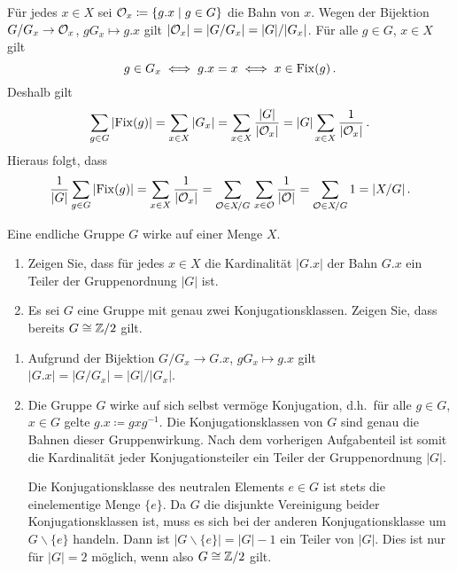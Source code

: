\begin{solution}
  Für jedes $x \in X$ sei $\mathcal{O}_x \coloneqq \{g.x \mid g \in G\}$ die Bahn von $x$.
  Wegen der Bijektion $G/G_x \to \mathcal{O}_x$, $g G_x \mapsto g.x$ gilt $|\mathcal{O}_x| = |G/G_x| = |G|/|G_x|$.
  Für alle $g \in G$, $x \in X$ gilt
  \[
          g \in G_x
    \iff  g.x = x
    \iff  x \in \operatorname{Fix}(g) \,.
  \]
  Deshalb gilt
  \[
      \sum_{g \in G} |{\operatorname{Fix}(g)}|
    = \sum_{x \in X} |G_x|
    = \sum_{x \in X} \frac{|G|}{|\mathcal{O}_x|}
    = |G| \sum_{x \in X} \frac{1}{|\mathcal{O}_x|} \,.
  \]
  Hieraus folgt, dass
  \[
      \frac{1}{|G|} \sum_{g \in G} |{\operatorname{Fix}(g)}|
    = \sum_{x \in X} \frac{1}{|\mathcal{O}_x|}
    = \sum_{\mathcal{O} \in X\!/G} \, \sum_{x \in \mathcal{O}} \frac{1}{|\mathcal{O}|}
    = \sum_{\mathcal{O} \in X\!/G} 1
    = |X/G| \,.
  \]

\end{solution}


\begin{question}[subtitle = Genau zwei Konjugationsklassen]
  Eine endliche Gruppe $G$ wirke auf einer Menge $X$.
  \begin{enumerate}
    \item
      Zeigen Sie, dass für jedes $x \in X$ die Kardinalität $|G.x|$ der Bahn $G.x$ ein Teiler der Gruppenordnung $|G|$ ist.
    \item
      Es sei $G$ eine Gruppe mit genau zwei Konjugationsklassen.
      Zeigen Sie, dass bereits $G \cong \mathbb{Z}/2$ gilt.
  \end{enumerate}
\end{question}


\begin{solution}
  \begin{enumerate}
    \item
      Aufgrund der Bijektion $G/G_x \to G.x$, $gG_x \mapsto g.x$ gilt $|G.x| = |G/G_x| = |G|/|G_x|$.
    \item
      Die Gruppe $G$ wirke auf sich selbst vermöge Konjugation, d.h.\ für alle $g \in G$, $x \in G$ gelte $g.x \coloneqq gxg^{-1}$.
      Die Konjugationsklassen von $G$ sind genau die Bahnen dieser Gruppenwirkung.
      Nach dem vorherigen Aufgabenteil ist somit die Kardinalität jeder Konjugationsteiler ein Teiler der Gruppenordnung $|G|$.
      
      Die Konjugationsklasse des neutralen Elements $e \in G$ ist stets die einelementige Menge $\{e\}$.
      Da $G$ die disjunkte Vereinigung beider Konjugationsklassen ist, muss es sich bei der anderen Konjugationsklasse um $G \smallsetminus \{e\}$ handeln.
      Dann ist $|G \smallsetminus \{e\}| = |G|-1$ ein Teiler von $|G|$.
      Dies ist nur für $|G| = 2$ möglich, wenn also $G \cong \mathbb{Z}/2$ gilt.
  \end{enumerate}
\end{solution}


